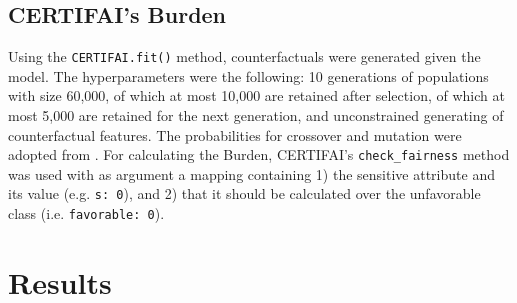 \documentclass[runningheads]{llncs}
\begin{document}
\subsection{CERTIFAI's Burden}\label{sec:certifai}
Using the \texttt{CERTIFAI.fit()} method, counterfactuals were generated given the model. The hyperparameters were the following: 10 generations of populations with size 60,000, of which at most 10,000 are retained after selection, of which at most 5,000 are retained for the next generation, and unconstrained generating of counterfactual features. The probabilities for crossover and mutation were adopted from \cite{certifai}. For calculating the Burden, CERTIFAI's \texttt{check\_fairness} method was used with as argument a mapping containing 1) the 
sensitive attribute and its value (e.g. \texttt{s: 0}), and 2) that it should be calculated over the unfavorable class (i.e. \texttt{favorable: 0}).

\section{Results}\label{sec:results}
\end{document}
